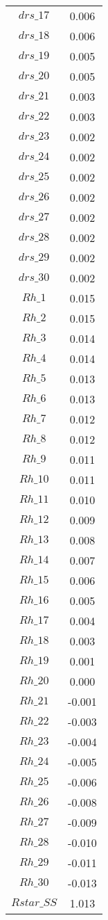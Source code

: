 \begin{center}
\begin{longtable}{cc}
$drs\_17$ 	 & 	 0.006 \\
$drs\_18$ 	 & 	 0.006 \\
$drs\_19$ 	 & 	 0.005 \\
$drs\_20$ 	 & 	 0.005 \\
$drs\_21$ 	 & 	 0.003 \\
$drs\_22$ 	 & 	 0.003 \\
$drs\_23$ 	 & 	 0.002 \\
$drs\_24$ 	 & 	 0.002 \\
$drs\_25$ 	 & 	 0.002 \\
$drs\_26$ 	 & 	 0.002 \\
$drs\_27$ 	 & 	 0.002 \\
$drs\_28$ 	 & 	 0.002 \\
$drs\_29$ 	 & 	 0.002 \\
$drs\_30$ 	 & 	 0.002 \\
$Rh\_1$ 	 & 	 0.015 \\
$Rh\_2$ 	 & 	 0.015 \\
$Rh\_3$ 	 & 	 0.014 \\
$Rh\_4$ 	 & 	 0.014 \\
$Rh\_5$ 	 & 	 0.013 \\
$Rh\_6$ 	 & 	 0.013 \\
$Rh\_7$ 	 & 	 0.012 \\
$Rh\_8$ 	 & 	 0.012 \\
$Rh\_9$ 	 & 	 0.011 \\
$Rh\_10$ 	 & 	 0.011 \\
$Rh\_11$ 	 & 	 0.010 \\
$Rh\_12$ 	 & 	 0.009 \\
$Rh\_13$ 	 & 	 0.008 \\
$Rh\_14$ 	 & 	 0.007 \\
$Rh\_15$ 	 & 	 0.006 \\
$Rh\_16$ 	 & 	 0.005 \\
$Rh\_17$ 	 & 	 0.004 \\
$Rh\_18$ 	 & 	 0.003 \\
$Rh\_19$ 	 & 	 0.001 \\
$Rh\_20$ 	 & 	 0.000 \\
$Rh\_21$ 	 & 	 -0.001 \\
$Rh\_22$ 	 & 	 -0.003 \\
$Rh\_23$ 	 & 	 -0.004 \\
$Rh\_24$ 	 & 	 -0.005 \\
$Rh\_25$ 	 & 	 -0.006 \\
$Rh\_26$ 	 & 	 -0.008 \\
$Rh\_27$ 	 & 	 -0.009 \\
$Rh\_28$ 	 & 	 -0.010 \\
$Rh\_29$ 	 & 	 -0.011 \\
$Rh\_30$ 	 & 	 -0.013 \\
$Rstar\_SS$ 	 & 	 1.013 \\
\bottomrule%
\end{longtable}
\end{center}
